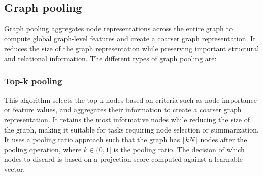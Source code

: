 \subsection{Graph pooling}
Graph pooling aggregates node representations across the entire graph to compute global graph-level features and create a coarser graph representation. It reduces the size of the graph representation while preserving important structural and relational information. The different types of graph pooling are:
\subsubsection{Top-k pooling} 
This algorithm selects the top k nodes based on criteria such as node importance or feature values, and aggregates their information to create a coarser graph representation. It retains the most informative nodes while reducing the size of the graph, making it suitable for tasks requiring node selection or summarization. It uses a pooling ratio approach such that the graph has $\lfloor kN \rfloor$ nodes after the pooling operation, where $k \in (0, 1]$ is the pooling ratio. The decision of which nodes to discard is based on a projection score computed against a learnable vector.

